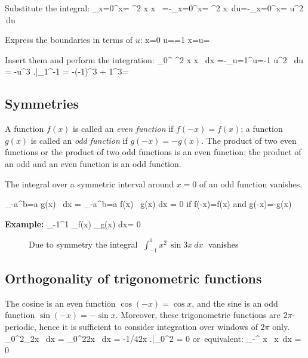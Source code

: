 Substitute the integral:
\bnn
\int_{x=0}^{x=\pi} \cos^2 x \; \sin x \, =-\int_{x=0}^{x=\pi} \cos^2 x \,du=-\int_{x=0}^{x=\pi} u^2 \,du
\enn \vs

Express the boundaries in terms of $u$:
\bnn x=0 \quad \rightarrow\quad u==1 \qquad\qquad\qquad\qquad x=\pi \quad \rightarrow\quad u=\cos {} \enn \svs

Insert them and perform the integration:
\bnn
\int_0^{\pi} \cos^2 x \; \sin x \, dx
   =-\int_{u=1}^{u=-1} u^2 \, du = -u^3 \! \left.\frac{}{}\right|_1^{-1} 
   = -(-1)^3 + 1^3=
\enn

\subsection{Symmetries}
A function $f(x)$ is called an {\em even function} if $f(-x)=f(x)$; a function $g(x)$ is called an {\em odd function}
if $g(-x)=-g(x)$. The product of two even functions or the product of two odd functions is an even function; the product
of an odd and an even function is an odd function.

The integral over a symmetric interval around $x=0$ of an odd function vanishes.
 
\bnn 
\int_{-a}^{b=a} g(x) \, dx = \int_{-a}^{b=a} f(x) \, g(x) \: dx = 0 \qquad
\mbox{if} \;\; f(-x)=f(x) \quad \mbox{and} \quad g(-x)=-g(x) 
\enn

{\bf Example:}
\bnn \int_{-1}^1 _{f(x)} _{g(x)}\: dx= 0 \enn

\begin{figure}[!h]
    \centerline{\epsfxsize=12cm \epsfysize=8cm  } \svs
    \caption{Due to symmetry the integral $\; \int_{-1}^1 x^2 \, \sin 3x\:dx\;$ vanishes} \label{fig26}
\end{figure} \vs \svs

\subsection{Orthogonality of trigonometric functions}
The cosine is an even function $\cos (-x)=\cos x$, and the sine is an odd function \mbox{$\sin(-x)=-\sin x$.}
Moreover, these trigonometric functions are $2\pi$-periodic, hence it is sufficient to consider integration
over windows of $2\pi$ only.
\bnn
\int_0^{2\pi}_{\sin 2x} \, dx
    =  \int_0^{2\pi}\sin 2x \, dx = -1/4\cos 2x \! \left.\frac{}{}\right|_0^{2\pi} = 0 \quad \mbox{or equivalent:} \;\;
     \int_{-\pi}^{\pi} \sin x \, \cos x\, dx = 0
\enn

